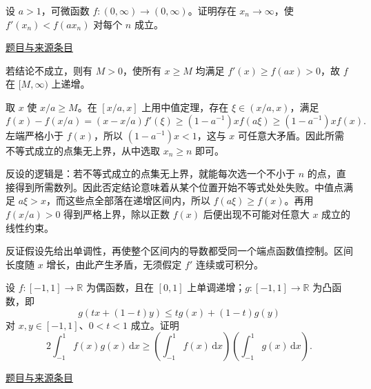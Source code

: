 \documentclass[12pt,fontset=fandol]{ctexart}
\begin{document}
\begin{example}[来源序号4]\label{ex:pre05-math:4}\label{pr:pre05-math:4}

设 $a>1$，可微函数 $f:(0,\infty)\to(0,\infty)$。证明存在 $x_n\to\infty$，使 $f'(x_n)<f(ax_n)$ 对每个 $n$ 成立。

\par\href{https://github.com/lzxcr/cmc-mathematics/blob/64916fa1fdbc3e444a652eca204d5669058ee321/src/problems/preliminary/05/04.md}{题目与来源条目}

\end{example}

\begin{solve}\label{ans:pre05-math:4}

若结论不成立，则有 $M>0$，使所有 $x\ge M$ 均满足 $f'(x)\ge f(ax)>0$，故 $f$ 在 $[M,\infty)$ 上递增。

取 $x$ 使 $x/a\ge M$。在 $[x/a,x]$ 上用中值定理，存在 $\xi\in(x/a,x)$，满足
\[
f(x)-f(x/a)=(x-x/a)f'(\xi)
\ge(1-a^{-1})x f(a\xi)
\ge(1-a^{-1})x f(x).
\]
左端严格小于 $f(x)$，所以 $(1-a^{-1})x<1$，这与 $x$ 可任意大矛盾。因此所需不等式成立的点集无上界，从中选取 $x_n\ge n$ 即可。

反设的逻辑是：若不等式成立的点集无上界，就能每次选一个不小于 $n$ 的点，直接得到所需数列。因此否定结论意味着从某个位置开始不等式处处失败。中值点满足 $a\xi>x$，而这些点全部落在递增区间内，所以 $f(a\xi)\ge f(x)$。再用 $f(x/a)>0$ 得到严格上界，除以正数 $f(x)$ 后便出现不可能对任意大 $x$ 成立的线性约束。

\end{solve}

\begin{remark}[方法与条件]反证假设先给出单调性，再使整个区间内的导数都受同一个端点函数值控制。区间长度随 $x$ 增长，由此产生矛盾，无须假定 $f'$ 连续或可积分。\end{remark}

\begin{example}[来源序号5]\label{ex:pre05-math:5}\label{pr:pre05-math:5}

设 $f:[-1,1]\to\mathbb R$ 为偶函数，且在 $[0,1]$ 上单调递增；$g:[-1,1]\to\mathbb R$ 为凸函数，即
\[
g(tx+(1-t)y)\le tg(x)+(1-t)g(y)
\]
对 $x,y\in[-1,1]$、$0<t<1$ 成立。证明
\[
2\int_{-1}^1f(x)g(x)\,\mathrm dx
\ge\left(\int_{-1}^1f(x)\,\mathrm dx\right)
\left(\int_{-1}^1g(x)\,\mathrm dx\right).
\]

\par\href{https://github.com/lzxcr/cmc-mathematics/blob/64916fa1fdbc3e444a652eca204d5669058ee321/src/problems/preliminary/05/05.md}{题目与来源条目}

\end{example}
\end{document}
